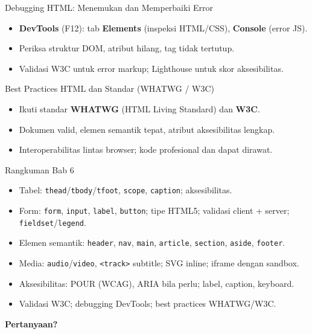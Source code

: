 \documentclass[handout]{beamer}
\begin{document}
\begin{frame}{Debugging HTML: Menemukan dan Memperbaiki Error}
	\begin{itemize}
		\item \textbf{DevTools} (F12): tab \textbf{Elements} (inspeksi HTML/CSS), \textbf{Console} (error JS).
		\item Periksa struktur DOM, atribut hilang, tag tidak tertutup.
		\item Validasi W3C untuk error markup; Lighthouse untuk skor aksesibilitas.
	\end{itemize}
\end{frame}

\begin{frame}{Best Practices HTML dan Standar (WHATWG / W3C)}
	\begin{itemize}
		\item Ikuti standar \textbf{WHATWG} (HTML Living Standard) dan \textbf{W3C}.
		\item Dokumen valid, elemen semantik tepat, atribut aksesibilitas lengkap.
		\item Interoperabilitas lintas browser; kode profesional dan dapat dirawat.
	\end{itemize}
\end{frame}

\begin{frame}{Rangkuman Bab 6}
	\begin{itemize}
		\item Tabel: \texttt{thead}/\texttt{tbody}/\texttt{tfoot}, \texttt{scope}, \texttt{caption}; aksesibilitas.
		\item Form: \texttt{form}, \texttt{input}, \texttt{label}, \texttt{button}; tipe HTML5; validasi client + server; \texttt{fieldset}/\texttt{legend}.
		\item Elemen semantik: \texttt{header}, \texttt{nav}, \texttt{main}, \texttt{article}, \texttt{section}, \texttt{aside}, \texttt{footer}.
		\item Media: \texttt{audio}/\texttt{video}, \texttt{<track>} subtitle; SVG inline; iframe dengan sandbox.
		\item Aksesibilitas: POUR (WCAG), ARIA bila perlu; label, caption, keyboard.
		\item Validasi W3C; debugging DevTools; best practices WHATWG/W3C.
	\end{itemize}
\end{frame}

\begin{frame}{}
	\centering
	\vfill
	\textbf{\Large Pertanyaan?}
	\vfill
\end{frame}
\end{document}
